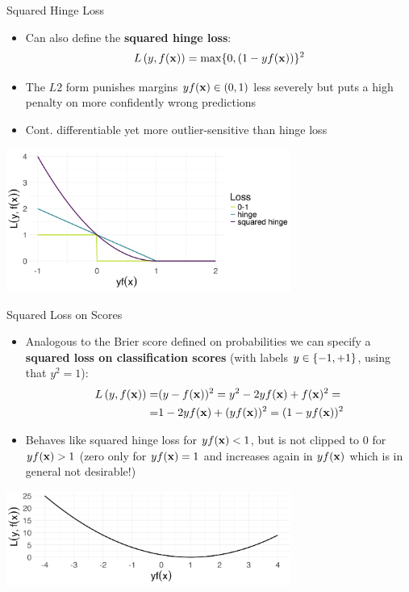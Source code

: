 \documentclass[11pt,compress,t,notes=noshow, xcolor=table]{beamer}
\begin{document}
\begin{vbframe}{Squared Hinge Loss}

\begin{itemize}
  \item Can also define the \textbf{squared hinge loss}:
  $$L\left(y, f(\mathbf{x})\right) = \max \{ 0, (1 - yf(\mathbf{x}))\}^2$$
  \item The $L2$ form punishes margins $yf(\mathbf{x}) \in (0, 1)$ less severely but puts 
  a high penalty on more confidently wrong predictions
  \item Cont. differentiable yet more outlier-sensitive than hinge loss
\end{itemize}

\begin{center}
\includegraphics[width = 0.7\textwidth]{figure/hinge_squared.png}
\end{center}

\end{vbframe}


\begin{vbframe}{Squared Loss on Scores}


\begin{itemize}
  \item Analogous to the Brier score defined on probabilities we can specify a 
  \textbf{squared loss on classification scores} (with labels $y \in \{-1, +1\}$, using 
  that $y^2 = 1$):
  \begin{eqnarray*}
  L\left(y, f(\mathbf{x})\right) = &(y - f(\mathbf{x}))^2 = y^2 - 2yf(\mathbf{x}) + f(\mathbf{x})^2 =\\
  = &1 - 2yf(\mathbf{x}) + (yf(\mathbf{x}))^2 = (1 - yf(\mathbf{x}))^2
  \end{eqnarray*}
  \item Behaves like squared hinge loss for $yf(\mathbf{x}) < 1$, but is not clipped to $0$ for $yf(\mathbf{x})>1$ (zero only for $yf(\mathbf{x}) = 1$ and increases again in $yf(\mathbf{x})$ which is in general not desirable!)
\end{itemize}

\begin{center}
\includegraphics[width = 0.7\textwidth]{figure/squared_scores.png}
\end{center}

\end{vbframe}
\end{document}

